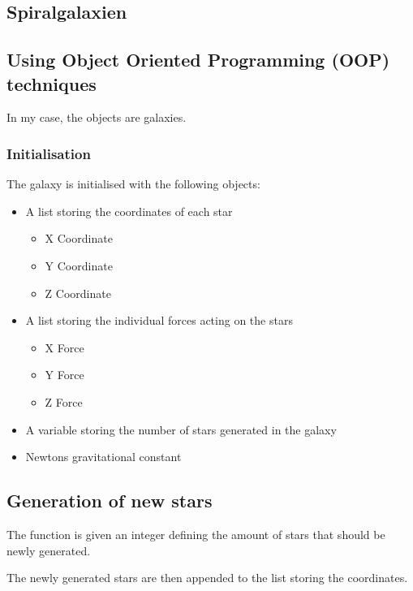 \subsection{Spiralgalaxien}

\subsection{Using Object Oriented Programming (OOP) techniques}

In my case, the objects are galaxies.

\subsubsection{Initialisation}

The galaxy is initialised with the following objects:

\begin{itemize}
  \item A list storing the coordinates of each star
  \begin{itemize}
    \item X Coordinate
    \item Y Coordinate
    \item Z Coordinate
  \end{itemize}

  \item A list storing the individual forces acting on the stars
  \begin{itemize}
    \item X Force
    \item Y Force
    \item Z Force
  \end{itemize}

  \item A variable storing the number of stars generated in the galaxy

  \item Newtons gravitational constant
\end{itemize}

\subsection{Generation of new stars}

The function is given an integer defining the amount of stars that should be
newly generated.

The newly generated stars are then appended to the list storing the coordinates.

